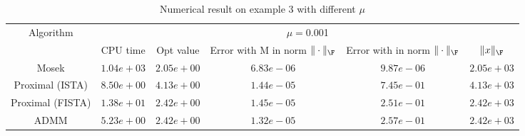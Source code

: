 \begin{table}
\centering
\begin{tabular}{|c|c|c|c|c|c|}

\hline
\multirow{2}{*}{ Algorithm} &\multicolumn{5}{c|}{$\mu=$0.001}\\\cline{2-6}
 &CPU time &Opt value &Error with M in norm $\|\cdot\|_\F$ &Error with in norm $\|\cdot\|_\F$ &$\|x\|_\F$\\\hline
Mosek & $1.04e+03$ & $2.05e+00$ & $6.83e-06$ & $9.87e-06$ & $2.05e+03$\\\hline
Proximal (ISTA) & $8.50e+00$ & $4.13e+00$ & $1.44e-05$ & $7.45e-01$ & $4.13e+03$\\\hline
Proximal (FISTA) & $1.38e+01$ & $2.42e+00$ & $1.45e-05$ & $2.51e-01$ & $2.42e+03$\\\hline
ADMM & $5.23e+00$ & $2.42e+00$ & $1.32e-05$ & $2.57e-01$ & $2.42e+03$\\\hline
\end{tabular}
\caption{Numerical result on example 3 with different $\mu$\label{example3}}
\end{table}
